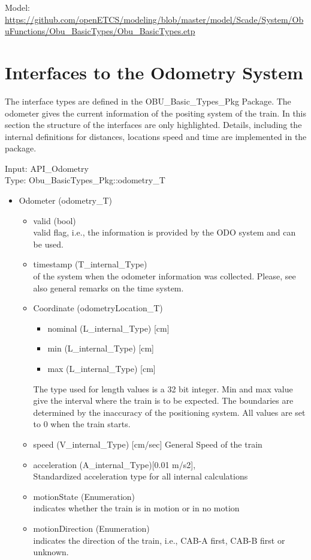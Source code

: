 \documentclass{template/openetcs_report}
\begin{document}
Model: \url{https://github.com/openETCS/modeling/blob/master/model/Scade/System/ObuFunctions/Obu_BasicTypes/Obu_BasicTypes.etp}

\section{Interfaces to the Odometry System}
The interface types are defined in the OBU\_Basic\_Types\_Pkg Package. 
The odometer gives the current information of the positing system of the train. In this section the structure of the interfaces are only highlighted. Details, including the internal definitions for distances, locations speed and time are implemented in the package. 

Input: API\_Odometry\\
Type: Obu\_BasicTypes\_Pkg::odometry\_T

\begin{itemize}
\item Odometer (odometry\_T)
\begin{itemize}
\item valid (bool)\\
valid flag, i.e., the information is provided by the ODO system and can be used.
\item timestamp (T\_internal\_Type)\\
of the system when the odometer information was collected. Please, see also general remarks on the time system. 
\item Coordinate (odometryLocation\_T)
\begin{itemize}
\item nominal (L\_internal\_Type) [cm]
\item min (L\_internal\_Type) [cm]
\item max (L\_internal\_Type) [cm]
\end{itemize}
The type used for length values is a 32 bit integer. 
Min and max value give the interval where the train is to be expected. The boundaries are determined by the inaccuracy of the positioning system. All values are set to 0 when the train starts.
\item speed (V\_internal\_Type) [cm/sec]
General Speed of the train
\item acceleration (A\_internal\_Type)[0.01 m/s2],\\
Standardized acceleration type for all internal calculations
\item motionState (Enumeration)\\
indicates whether the train is in motion or in no motion
\item motionDirection (Enumeration)\\
indicates the direction of the train, i.e., CAB-A first, CAB-B first or unknown.
\end{itemize}
\end{itemize}
\end{document}
